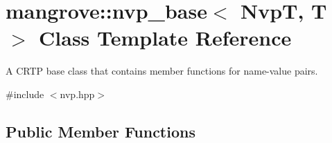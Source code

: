 \hypertarget{classmangrove_1_1nvp__base}{}\section{mangrove\+:\+:nvp\+\_\+base$<$ NvpT, T $>$ Class Template Reference}
\label{classmangrove_1_1nvp__base}


A C\+R\+TP base class that contains member functions for name-\/value pairs.  




{\ttfamily \#include $<$nvp.\+hpp$>$}

\subsection*{Public Member Functions}
